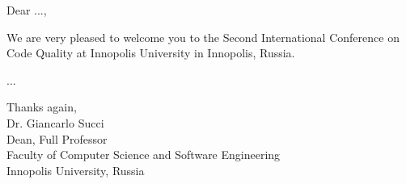 \cleardoublepage
{}

Dear ...,

We are very pleased to welcome you to the Second International Conference on Code Quality at Innopolis University in Innopolis, Russia.

...

Thanks again,\\
Dr. Giancarlo Succi\\
Dean, Full Professor\\
Faculty of Computer Science and Software Engineering\\
Innopolis University, Russia
